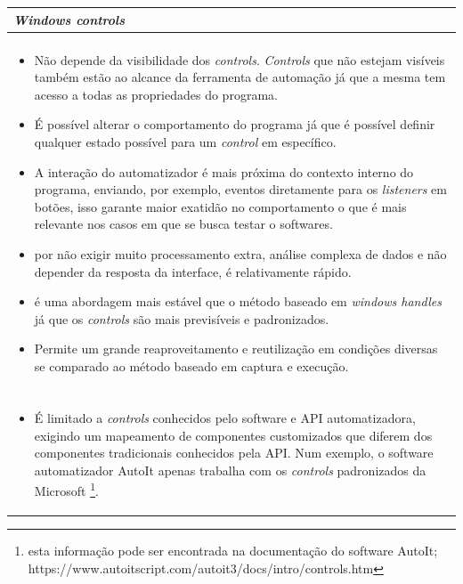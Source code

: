 \documentclass[tg]{mdtufsm}
\begin{document}
{                \begin{tabularx}{\textwidth}{|*{1}{>{\centering\arraybackslash}X}|}
                    \hline
                    \emph{Windows controls} \\
                    \hline
                    {\bf Prós:} \\
                    \begin{itemize}
                        \item Não depende da visibilidade dos \emph{controls}. \emph{Controls} que não estejam visíveis também estão ao alcance da ferramenta de automação já que a mesma tem acesso a todas as propriedades do programa.
                        \item É possível alterar o comportamento do programa já que é possível definir qualquer estado possível para um \emph{control} em específico.
                        \item A interação do automatizador é mais próxima do contexto interno do programa, enviando, por exemplo, eventos diretamente para os \emph{listeners} em botões, isso garante maior exatidão no comportamento o que é mais relevante nos casos em que se busca testar o softwares.
                        \item por não exigir muito processamento extra, análise complexa de dados e não depender da resposta da interface, é relativamente rápido.
                        \item é uma abordagem mais estável que o método baseado em \emph{windows handles} já que os \emph{controls} são mais previsíveis e padronizados.
                        \item Permite um grande reaproveitamento e reutilização em condições diversas se comparado ao método baseado em captura e execução.
                    \end{itemize}
                    \\ {\bf contras:} \\
                    \begin{itemize}
                        \item É limitado a \emph{controls} conhecidos pelo software e API automatizadora, exigindo um mapeamento de componentes customizados que diferem dos componentes tradicionais conhecidos pela API. Num exemplo, o software automatizador AutoIt apenas trabalha com os \emph{controls} padronizados da Microsoft \footnote{esta informação pode ser encontrada na documentação do software AutoIt; https://www.autoitscript.com/autoit3/docs/intro/controls.htm}.

\end{itemize}
\end{tabularx}}
\end{document}
